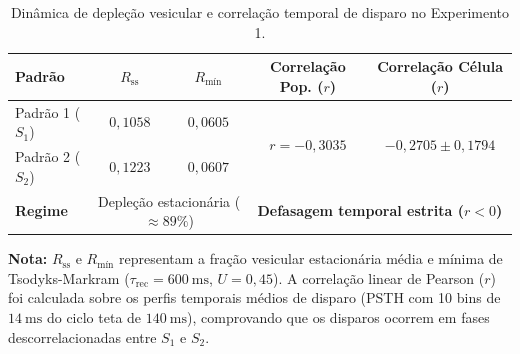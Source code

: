 \begin{table}[tbp]
    \centering
    \footnotesize
    \setlength{\tabcolsep}{3pt}
    \caption{Dinâmica de depleção vesicular e correlação temporal de disparo no Experimento 1.}
    \label{tab:resultados_exp1_dinamica}
    \begin{tabular}{lcccc}
        \toprule
        \textbf{Padrão} & \textbf{$R_{\text{ss}}$} & \textbf{$R_{\text{mín}}$} & \textbf{Correlação Pop. ($r$)} & \textbf{Correlação Célula ($r$)} \\
        \midrule
        Padrão 1 ($S_1$) & $0{,}1058$ & $0{,}0605$ & \multirow{2}{*}{$r = -0{,}3035$} & \multirow{2}{*}{$-0{,}2705 \pm 0{,}1794$} \\
        Padrão 2 ($S_2$) & $0{,}1223$ & $0{,}0607$ & & \\
        \midrule
        \textbf{Regime} & \multicolumn{2}{c}{Depleção estacionária ($\approx 89\%$)} & \multicolumn{2}{c}{\textbf{Defasagem temporal estrita ($r < 0$)}} \\
        \bottomrule
    \end{tabular}
    \vspace{0.2em}
    \begin{minipage}{0.95\textwidth}
        \footnotesize \textbf{Nota:} $R_{\text{ss}}$ e $R_{\text{mín}}$ representam a fração vesicular estacionária média e mínima de Tsodyks-Markram ($\tau_{\text{rec}} = \qty{600}{\milli\second}$, $U = 0{,}45$). A correlação linear de Pearson ($r$) foi calculada sobre os perfis temporais médios de disparo (PSTH com 10 bins de $\qty{14}{\milli\second}$ do ciclo teta de $\qty{140}{\milli\second}$), comprovando que os disparos ocorrem em fases descorrelacionadas entre $S_1$ e $S_2$.
    \end{minipage}
\end{table}

